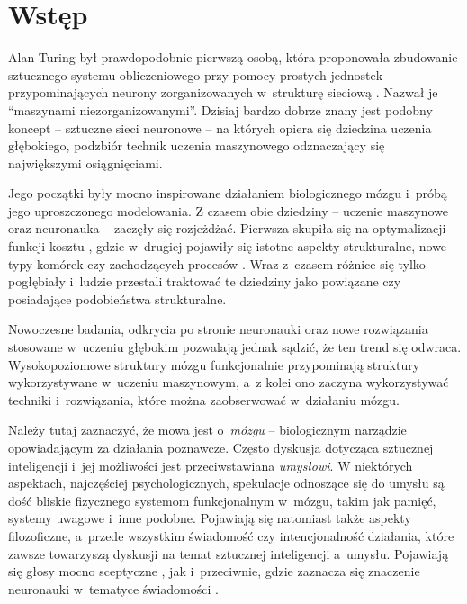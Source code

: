 \chapter*{Wstęp}

Alan Turing był prawdopodobnie pierwszą osobą, która proponowała zbudowanie sztucznego systemu obliczeniowego przy pomocy prostych jednostek przypominających neurony zorganizowanych w~strukturę sieciową \cite{turing1969intelligent}.
Nazwał je ``maszynami niezorganizowanymi''.
Dzisiaj bardzo dobrze znany jest podobny koncept -- sztuczne sieci neuronowe -- na których opiera się dziedzina uczenia głębokiego, podzbiór technik uczenia maszynowego odznaczający się największymi osiągnięciami.

Jego początki były mocno inspirowane działaniem biologicznego mózgu i~próbą jego uproszczonego modelowania.
Z czasem obie dziedziny -- uczenie maszynowe oraz neuronauka -- zaczęły się rozjeżdżać.
Pierwsza skupiła się na optymalizacji funkcji kosztu \cite{sutskever2013importance}, gdzie w~drugiej pojawiły się istotne aspekty strukturalne, nowe typy komórek czy zachodzących procesów \cite{solari2011cognitive}.
Wraz z~czasem różnice się tylko pogłębiały i~ludzie przestali traktować te dziedziny jako powiązane czy posiadające podobieństwa strukturalne.

Nowoczesne badania, odkrycia po stronie neuronauki oraz nowe rozwiązania stosowane w~uczeniu głębokim pozwalają jednak sądzić, że ten trend się odwraca.
Wysokopoziomowe struktury mózgu funkcjonalnie przypominają struktury wykorzystywane w~uczeniu maszynowym, a~z kolei ono zaczyna wykorzystywać techniki i~rozwiązania, które można zaobserwować w~działaniu mózgu.

Należy tutaj zaznaczyć, że mowa jest o~\emph{mózgu} -- biologicznym narządzie opowiadającym za działania poznawcze.
Często dyskusja dotycząca sztucznej inteligencji i~jej możliwości jest przeciwstawiana \emph{umysłowi}.
W niektórych aspektach, najczęściej psychologicznych, spekulacje odnoszące się do umysłu są dość bliskie fizycznego systemom funkcjonalnym w~mózgu, takim jak pamięć, systemy uwagowe i~inne podobne.
Pojawiają się natomiast także aspekty filozoficzne, a~przede wszystkim świadomość czy intencjonalność działania, które zawsze towarzyszą dyskusji na temat sztucznej inteligencji a~umysłu.
Pojawiają się głosy mocno sceptyczne \cite{searle1980minds}, jak i~przeciwnie, gdzie zaznacza się znaczenie neuronauki w~tematyce świadomości \cite{reggia2013rise}.

